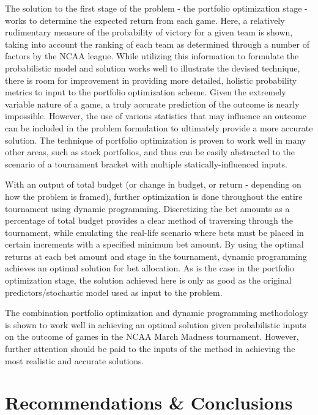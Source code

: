 \documentclass[12pt]{article}
\begin{document}
The solution to the first stage of the problem - the portfolio optimization stage - works to determine the expected return from each game.
Here, a relatively rudimentary measure of the probability of victory for a given team is shown, taking into account the ranking of each team as determined through a number of factors by the NCAA league.
While utilizing this information to formulate the probabilistic model and solution works well to illustrate the devised technique, there is room for improvement in providing more detailed, holistic probability metrics to input to the portfolio optimization scheme.
Given the extremely variable nature of a game, a truly accurate prediction of the outcome is nearly impossible.
However, the use of various statistics that may influence an outcome can be included in the problem formulation to ultimately provide a more accurate solution.
The technique of portfolio optimization is proven to work well in many other areas, such as stock portfolios, and thus can be easily abstracted to the scenario of a tournament bracket with multiple statically-influenced inputs.

With an output of total budget (or change in budget, or return - depending on how the problem is framed), further optimization is done throughout the entire tournament using dynamic programming.
Discretizing the bet amounts as a percentage of total budget provides a clear method of traversing through the tournament, while emulating the real-life scenario where bets must be placed in certain increments with a specified minimum bet amount.
By using the optimal returns at each bet amount and stage in the tournament, dynamic programming achieves an optimal solution for bet allocation.
As is the case in the portfolio optimization stage, the solution achieved here is only as good as the original predictors/stochastic model used as input to the problem.

The combination portfolio optimization and dynamic programming methodology is shown to work well in achieving an optimal solution given probabilistic inputs on the outcome of games in the NCAA March Madness tournament.
However, further attention should be paid to the inputs of the method in achieving the most realistic and accurate solutions.

\newpage
\section{Recommendations \& Conclusions}
\end{document}
